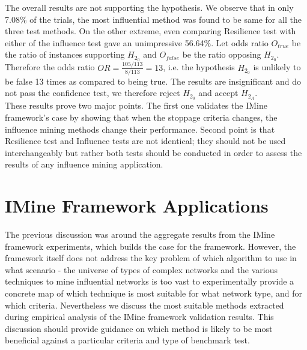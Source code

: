 			The overall results are not supporting the hypothesis. We observe that in only 7.08\% of the trials, the most influential method was found to be same for all the three test methods. On the other extreme, even comparing Resilience test with either of the influence test gave an unimpressive 56.64\%. Let odds ratio $O_{true}$ be the ratio of instances supporting $H_{2_0}$ and $O_{false}$ be the ratio opposing $H_{2_0}$. Therefore the odds ratio $OR=\frac{105/113}{8/113}=13$, i.e. the hypothesis $H_{2_0}$ is unlikely to be false 13 times as compared to being true. The results are insignificant and do not pass the confidence test, we therefore reject $H_{2_0}$ and accept $H_{2_A}$. \\

		These results prove two major points. The first one validates the IMine framework's case by showing that when the stoppage criteria changes, the influence mining methods change their performance. Second point is that Resilience test and Influence tests are not identical; they should not be used interchangeably but rather both tests should be conducted in order to assess the results of any influence mining application.
		
		

	\section{IMine Framework Applications}
	\label{sec:inf-framework-applications}
	The previous discussion was around the aggregate results from the IMine framework experiments, which builds the case for the framework. However, the framework itself does not address the key problem of which algorithm to use in what scenario - the universe of types of complex networks and the various techniques to mine influential networks is too vast to experimentally provide a concrete map of which technique is most suitable for what network type, and for which criteria. Nevertheless we discuss the most suitable methods extracted during empirical analysis of the IMine framework validation results. This discussion should provide guidance on which method is likely to be most beneficial against a particular criteria and type of benchmark test.
	

